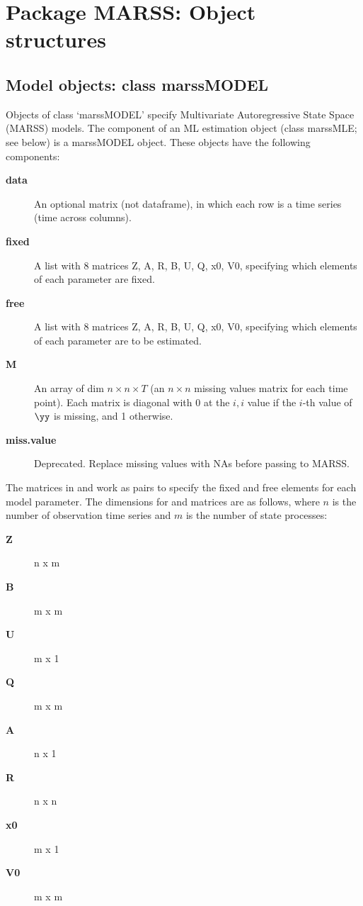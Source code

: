 \chapter{Package MARSS:  Object structures}

\section*{Model objects: class marssMODEL}
Objects of class `marssMODEL' specify Multivariate Autoregressive State Space (MARSS) models. The \verb@model@ component of an ML estimation object (class marssMLE; see below) is a marssMODEL object. These objects have the following components:

  \begin{description}
    \item[\textbf{data}]{ An optional matrix (not dataframe), in which each row is a time series (time across columns). }
    \item[\textbf{fixed}]{ A list with 8 matrices Z, A, R, B, U, Q, x0, V0, specifying which elements of each parameter are fixed. }
    \item[\textbf{free}]{ A list with 8 matrices Z, A, R, B, U, Q, x0, V0, specifying which elements of each parameter are to be estimated. }
    \item[\textbf{M}]{ An array of dim $n \times n \times T$ (an $n \times n$ missing values matrix for each time point).  Each matrix is diagonal with 0 at the $i,i$ value if the $i$-th value of $\yy$ is missing, and 1 otherwise.} 
    \item[\textbf{miss.value}]{ Deprecated. Replace missing values with NAs before passing to MARSS. }
  \end{description}

  The matrices in \verb@fixed@ and \verb@free@ work as pairs to specify the fixed and free elements for each model parameter. The dimensions for \verb@fixed@ and \verb@free@ matrices are as follows, where $n$ is the number of observation time series and $m$ is the number of state processes:
  \begin{description}
    \item[\textbf{Z}]{ n x m }
    \item[\textbf{B}]{ m x m }
    \item[\textbf{U}]{ m x 1 }
    \item[\textbf{Q}]{ m x m }
    \item[\textbf{A}]{ n x 1 }
    \item[\textbf{R}]{ n x n }
    \item[\textbf{x0}]{ m x 1 }
    \item[\textbf{V0}]{ m x m }
  \end{description} 

